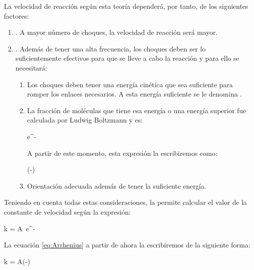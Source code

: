 La velocidad de reacción según esta teoría dependerá, por tanto, de los siguientes factores:
\begin{enumerate}[label=\numberballmDarkTeal]
        \item {}.
        A mayor número de choques, la velocidad de reacción será mayor.
        \item {}.
        Además de tener una alta frecuencia, los choques deben ser lo suficientemente efectivos para que se lleve a cabo la reacción y para ello se necesitará:
        \begin{enumerate}
            \item Los choques deben tener una energía cinética que sea suficiente para romper los enlaces necesarios.
            A esta energía suficiente se le denomina .
            \item La fracción de moléculas que tiene esa energía o una energía superior fue calculada por Ludwig Boltzmann y es:
            \begin{centeredequation}
                e^{-}
            \end{centeredequation}
            A partir de este momento, esta expresión la escribiremos como:
            \begin{centeredequation}
                \exp\biggl(-\biggr)\label{eq:expresion_Boltzman}
            \end{centeredequation}

            \item Orientación adecuada además de tener la suficiente energía.
        \end{enumerate}
\end{enumerate}

Teniendo en cuenta todas estas consideraciones, la  permite calcular el valor de la constante de velocidad según la expresión:
\begin{centeredequation}
    k = A\ e^{-}\label{eq:Arrhenius}
\end{centeredequation}

La ecuación \eqref{eq:Arrhenius} a partir de ahora la escribiremos de la siguiente forma:
\begin{centeredequation}
    k = A\exp\biggl(-\biggr)\label{eq:Arrhenius_b}
\end{centeredequation}

